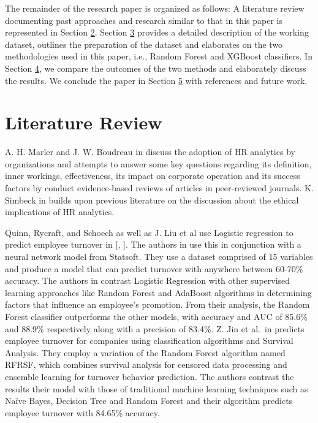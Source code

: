 \documentclass[runningheads]{llncs}
\begin{document}
The remainder of the research paper is organized as follows: A
literature review documenting past approaches and research similar to
that in this paper is represented in Section
\protect\hyperlink{literature-review}{2}. Section
\protect\hyperlink{methodology}{3} provides a detailed description of
the working dataset, outlines the preparation of the dataset and
elaborates on the two methodologies used in this paper, i.e., Random
Forest and XGBoost classifiers. In Section
\protect\hyperlink{results}{4}, we compare the outcomes of the two
methods and elaborately discuss the results. We conclude the paper in
Section \protect\hyperlink{conclusion}{5} with references and future
work.

\hypertarget{literature-review}{%
\section{Literature Review}\label{literature-review}}

A. H. Marler and J. W. Boudreau in
\cite{ref_Marler2017} discuss the adoption of HR
analytics by organizations and attempts to answer some key questions
regarding its definition, inner workings, effectiveness, its impact on
corporate operation and its success factors by conduct evidence-based
reviews of articles in peer-reviewed journals. K. Simbeck in
\cite{ref_Simbeck2019} builds upon previous
literature on the discussion about the ethical implications of HR
analytics.

Quinn, Rycraft, and Schoech as well as J. Liu et al use Logistic
regression to predict employee turnover in
{[}\cite{ref_Quinn2002},
\cite{ref_Liu2019}{]}. The authors in
\cite{ref_Quinn2002} use this in conjunction with
a neural network model from Statsoft. They use a dataset comprised of 15
variables and produce a model that can predict turnover with anywhere
between 60-70\% accuracy. The authors in
\cite{ref_Liu2019} contrast Logistic Regression
with other supervised learning approaches like Random Forest and
AdaBoost algorithms in determining factors that influence an employee's
promotion. From their analysis, the Random Forest classifier outperforms
the other models, with accuracy and AUC of 85.6\% and 88.9\%
respectively along with a precision of 83.4\%. Z. Jin et al.~in
\cite{ref_Jin2020} predicts employee turnover for
companies using classification algorithms and Survival Analysis. They
employ a variation of the Random Forest algorithm named RFRSF, which
combines survival analysis for censored data processing and ensemble
learning for turnover behavior prediction. The authors contrast the
results their model with those of traditional machine learning
techniques such as Naïve Bayes, Decision Tree and Random Forest and
their algorithm predicts employee turnover with 84.65\% accuracy.
\end{document}

